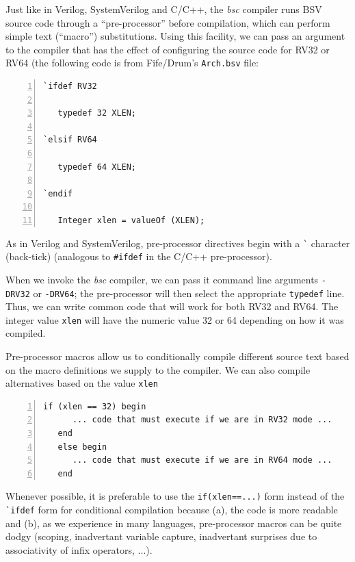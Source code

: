 \label{BSV_Conditional_compilation}


Just like in Verilog, SystemVerilog and C/C++, the \emph{bsc} compiler
runs BSV source code through a ``pre-processor'' before compilation,
which can perform simple text (``macro'') substitutions.  Using this
facility, we can pass an argument to the compiler that has the effect
of configuring the source code for RV32 or RV64 (the following code is
from Fife/Drum's \verb|Arch.bsv| file:

\begin{Verbatim}[frame=single, numbers=left]
`ifdef RV32

   typedef 32 XLEN;

`elsif RV64

   typedef 64 XLEN;

`endif

   Integer xlen = valueOf (XLEN);
\end{Verbatim}

As in Verilog and SystemVerilog, pre-processor directives begin with a
\verb|`| character (back-tick) (analogous to \verb|#ifdef| in the
C/C++ pre-processor).

When we invoke the \emph{bsc} compiler, we can pass it command line
arguments \verb|-DRV32| or \verb|-DRV64|; the pre-processor will then
select the appropriate \verb|typedef| line.  Thus, we can write common
code that will work for both RV32 and RV64.  The integer value
\verb|xlen| will have the numeric value 32 or 64 depending on how it
was compiled.

Pre-processor macros allow us to conditionally compile different
source text based on the macro definitions we supply to the compiler.
We can also compile alternatives based on the value \verb|xlen|

\begin{Verbatim}[frame=single, numbers=left]
   if (xlen == 32) begin
      ... code that must execute if we are in RV32 mode ...
   end
   else begin
      ... code that must execute if we are in RV64 mode ...
   end
\end{Verbatim}

Whenever possible, it is preferable to use the \verb|if(xlen==...)|
form instead of the \verb|`ifdef| form for conditional compilation
because (a), the code is more readable and (b), as we experience in
many languages, pre-processor macros can be quite dodgy (scoping,
inadvertant variable capture, inadvertant surprises due to
associativity of infix operators, ...).

